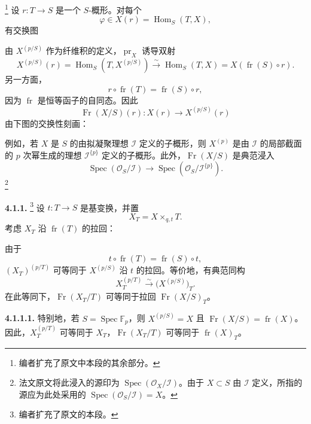 \footnote{编者扩充了原文中本段的其余部分。}
设 \(r:T\to S\) 是一个 \(S\)-概形。对每个
\[
  \varphi\in X(r)=\operatorname{Hom}_S(T,X),
\]
有交换图
\begin{center}
  \label{sga3:VIIA:4.1-point-phi-diagram}
  
\end{center}
由 \(X^{(p/S)}\) 作为纤维积的定义，\(\operatorname{pr}_X\) 诱导双射
\[
 X^{(p/S)}(r)
 =
 \operatorname{Hom}_S(T,X^{(p/S)})
 \xrightarrow{\sim}
 \operatorname{Hom}_S(T,X)
 =
 X(\operatorname{fr}(S)\circ r).
\]
另一方面，
\[
  r\circ\operatorname{fr}(T)
  =
  \operatorname{fr}(S)\circ r,
\]
因为 \(\operatorname{fr}\) 是恒等函子的自同态。因此
\[
  \operatorname{Fr}(X/S)(r):
  X(r)\longrightarrow X^{(p/S)}(r)
\]
由下图的交换性刻画：
\begin{center}
  \label{sga3:VIIA:4.1-pointwise-frobenius-square}
  
\end{center}

例如，若 \(X\) 是 \(S\) 的由拟凝聚理想 \(\mathcal I\) 定义的子概形，则 \(X^{(p)}\) 是由 \(\mathcal I\) 的局部截面的 \(p\) 次幂生成的理想 \(\mathcal I^{\{p\}}\) 定义的子概形。此外，\(\operatorname{Fr}(X/S)\) 是典范浸入
\[
  \operatorname{Spec}(\mathcal O_S/\mathcal I)
  \longrightarrow
  \operatorname{Spec}(\mathcal O_S/\mathcal I^{\{p\}}).
\]
\footnote{法文原文将此浸入的源印为 \(\operatorname{Spec}(\mathcal O_X/\mathcal I)\)。由于 \(X\subset S\) 由 \(\mathcal I\) 定义，所指的源应为此处采用的 \(\operatorname{Spec}(\mathcal O_S/\mathcal I)=X\)。}

\medskip
\noindent\textbf{4.1.1.}
\label{sga3:VIIA:4.1.1}
\footnote{编者扩充了原文的本段。}
设 \(t:T\to S\) 是基变换，并置
\[
  X_T=X\times_{q,t}T.
\]
考虑 \(X_T\) 沿 \(\operatorname{fr}(T)\) 的拉回：
\begin{center}
  \label{sga3:VIIA:4.1.1-basechange-rectangle}
  
\end{center}
由于
\[
  t\circ\operatorname{fr}(T)
  =
  \operatorname{fr}(S)\circ t,
\]
\((X_T)^{(p/T)}\) 可等同于 \(X^{(p/S)}\) 沿 \(t\) 的拉回。等价地，有典范同构
\[
  X_T^{(p/T)}
  \xrightarrow{\sim}
  \bigl(X^{(p/S)}\bigr)_T.
\]
在此等同下，\(\operatorname{Fr}(X_T/T)\) 可等同于拉回 \(\operatorname{Fr}(X/S)_T\)。

\medskip
\noindent\textbf{4.1.1.1.}
\label{sga3:VIIA:4.1.1.1}
特别地，若 \(S=\operatorname{Spec}\mathbb F_p\)，则 \(X^{(p/S)}=X\) 且 \(\operatorname{Fr}(X/S)=\operatorname{fr}(X)\)。因此，\(X_T^{(p/T)}\) 可等同于 \(X_T\)，\(\operatorname{Fr}(X_T/T)\) 可等同于 \(\operatorname{fr}(X)_T\)。

